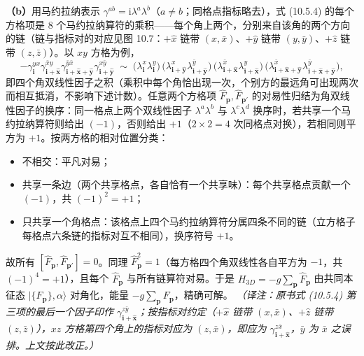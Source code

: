 \textbf{（b）}用马约拉纳表示 $\gamma^{ab}=\mathrm{i}\lambda^{a}\lambda^{b}$（$a\neq b$；同格点指标略去），式 (10.5.4) 的每个方格项是 $8$ 个马约拉纳算符的乘积——每个角上两个，分别来自该角的两个方向的链（链与指标对的对应见图 10.7：$+\hat x$ 链带 $(x,\bar x)$、$+\hat y$ 链带 $(y,\bar y)$、$+\hat z$ 链带 $(z,\bar z)$）。以 $xy$ 方格为例，
\begin{equation*}
-\gamma_{\pmb i}^{yx}\gamma_{\pmb{i}+\hat{\pmb x}}^{\bar x y}\gamma_{\pmb{i}+\hat{\pmb x}+\hat{\pmb y}}^{\bar y\bar x}\gamma_{\pmb{i}+\hat{\pmb y}}^{x\bar y}
\;\sim\;
\big(\lambda_{\pmb i}^{x}\lambda_{\pmb i}^{y}\big)\,
\big(\lambda_{\pmb{i}+\hat{\pmb y}}^{x}\lambda_{\pmb{i}+\hat{\pmb y}}^{\bar y}\big)\,
\big(\lambda_{\pmb{i}+\hat{\pmb x}}^{\bar x}\lambda_{\pmb{i}+\hat{\pmb x}}^{y}\big)\,
\big(\lambda_{\pmb{i}+\hat{\pmb x}+\hat{\pmb y}}^{\bar x}\lambda_{\pmb{i}+\hat{\pmb x}+\hat{\pmb y}}^{\bar y}\big),
\end{equation*}
即四个角双线性因子之积（乘积中每个角恰出现一次，个别方的最远角可出现两次而相互抵消，不影响下述计数）。任意两个方格项 $\hat F_{\pmb p},\hat F_{\pmb p'}$ 的对易性归结为角双线性因子的换序：同一格点上两个双线性因子 $\lambda^{a}\lambda^{b}$ 与 $\lambda^{c}\lambda^{d}$ 换序时，若共享一个马约拉纳算符则给出 $(-1)$，否则给出 $+1$（$2\times2=4$ 次同格点对换），若相同则平方为 $+1$。按两方格的相对位置分类：
\begin{itemize}
\item 不相交：平凡对易；
\item 共享一条边（两个共享格点，各自恰有一个共享味）：每个共享格点贡献一个 $(-1)$，共 $(-1)^{2}=+1$；
\item 只共享一个角格点：该格点上四个马约拉纳算符分属四条不同的链（立方格子每格点六条链的指标对互不相同），换序符号 $+1$。
\end{itemize}
故所有 $[\hat F_{\pmb p},\hat F_{\pmb p'}]=0$。同理 $\hat F_{\pmb p}^{2}=1$（每方格四个角双线性各自平方为 $-1$，共 $(-1)^{4}=+1$），且每个 $\hat F_{\pmb p}$ 与所有链算符对易。于是 $H_{3D}=-g\sum_{\pmb p}\hat F_{\pmb p}$ 由共同本征态 $|\{F_{\pmb p}\},\alpha\rangle$ 对角化，能量 $-g\sum_{\pmb p}F_{\pmb p}$，精确可解。
\emph{（译注：原书式 (10.5.4) 第三项的最后一个因子印作 $\gamma_{\pmb{i}+\hat{\pmb x}}^{z\bar y}$；按指标对约定（$+\hat x$ 链带 $(x,\bar x)$、$+\hat z$ 链带 $(z,\bar z)$），$xz$ 方格第四个角上的指标对应为 $(z,\bar x)$，即应为 $\gamma_{\pmb{i}+\hat{\pmb x}}^{z\bar x}$，$\bar y$ 为 $\bar x$ 之误排。上文按此改正。）}

